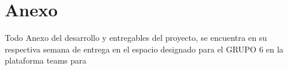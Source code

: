 \section{Anexo}
   Todo Anexo del desarrollo y entregables del proyecto, 
   se encuentra en su respectiva semana de entrega en el 
   espacio designado para el GRUPO 6 en la plataforma teams para
   